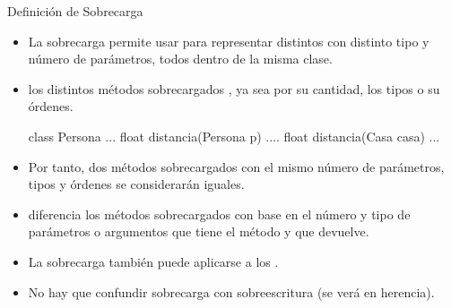 \documentclass[10pt,envcountsect,spanish]{beamer}
\begin{document}
\begin{frame}[fragile]{Definición de Sobrecarga} 

\begin{itemize}
\item La sobrecarga  permite usar  para representar distintos  con distinto tipo y número de parámetros, todos dentro de la misma clase.

\item {} los distintos métodos sobrecargados , ya sea por su cantidad, los tipos o su órdenes.

\begin{code}[caption={Sobrecarga de métodos}]
class Persona {
   ...
   float distancia(Persona p) { .... }
   float distancia(Casa casa) { ... }
}
\end{code}

\item Por tanto, dos métodos sobrecargados con el mismo número de parámetros, tipos y órdenes se considerarán iguales.

\item {} diferencia los métodos sobrecargados con base en el número y tipo de parámetros o argumentos que tiene el método y  que devuelve.

\item La sobrecarga también puede aplicarse a los .

\item No hay que confundir sobrecarga con sobreescritura (se verá en herencia).
\end{itemize}

\end{frame}
\end{document}
